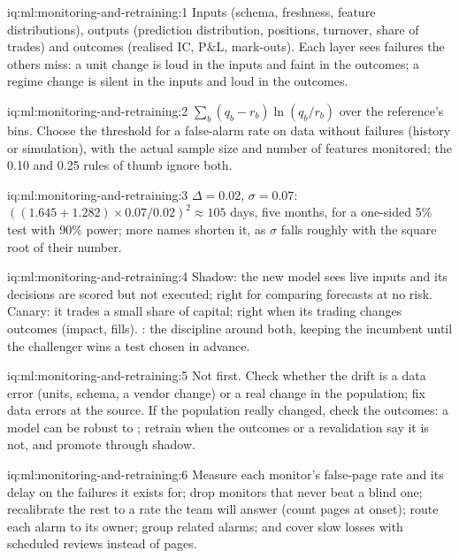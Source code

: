 \begin{solution}{iq:ml:monitoring-and-retraining:1}
Inputs (schema, freshness, feature distributions), outputs (prediction distribution, positions, turnover, share of trades) and
outcomes (realised IC, P\&L, mark-outs). Each layer sees failures the others miss: a unit change is loud in the inputs and faint in
the outcomes; a regime change is silent in the inputs and loud in the outcomes.
\end{solution}

\begin{solution}{iq:ml:monitoring-and-retraining:2}
$\sum_b(q_b-r_b)\ln(q_b/r_b)$ over the reference's bins. Choose the threshold for a false-alarm rate on data without failures
(history or simulation), with the actual sample size and number of features monitored; the 0.10 and 0.25 rules of thumb ignore
both.
\end{solution}

\begin{solution}{iq:ml:monitoring-and-retraining:3}
$\Delta=0.02$, $\sigma=0.07$: $((1.645+1.282)\times0.07/0.02)^2\approx105$ days, five months, for a one-sided 5\% test with 90\%
power; more names shorten it, as $\sigma$ falls roughly with the square root of their number.
\end{solution}

\begin{solution}{iq:ml:monitoring-and-retraining:4}
Shadow: the new model sees live inputs and its decisions are scored but not executed; right for comparing forecasts at no risk.
Canary: it trades a small share of capital; right when its trading changes outcomes (impact, fills). : the
discipline around both, keeping the incumbent until the challenger wins a test chosen in advance.
\end{solution}

\begin{solution}{iq:ml:monitoring-and-retraining:5}
Not first. Check whether the drift is a data error (units, schema, a vendor change) or a real change in the population; fix data
errors at the source. If the population really changed, check the outcomes: a model can be robust to ; retrain
when the outcomes or a revalidation say it is not, and promote through shadow.
\end{solution}

\begin{solution}{iq:ml:monitoring-and-retraining:6}
Measure each monitor's false-page rate and its delay on the failures it exists for; drop monitors that never beat a blind one;
recalibrate the rest to a rate the team will answer (count pages at onset); route each alarm to its owner; group related alarms;
and cover slow losses with scheduled reviews instead of pages.
\end{solution}
